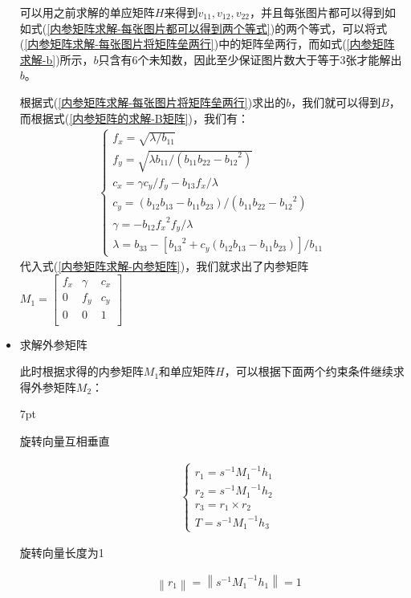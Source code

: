 \documentclass{article}
\newenvironment{formal}{%
	\def\FrameCommand{%
		\hspace{1pt}%
		{\color{DarkBlue}\vrule width 2pt}%
		{\color{formalshade}\vrule width 4pt}%
		\colorbox{formalshade}%
	}%
	\MakeFramed{\advance\hsize-\width\FrameRestore}%
	\noindent\hspace{-4.55pt}%
	\begin{adjustwidth}{}{7pt}%
		\vspace{2pt}\vspace{2pt}%
	}	{%
		\vspace{2pt}\end{adjustwidth}\endMakeFramed%
}
\begin{document}
\begin{itemize}
可以用之前求解的单应矩阵$H$来得到$v_{11},v_{12},v_{22}$，并且每张图片都可以得到如如式(\ref{内参矩阵求解-每张图片都可以得到两个等式})的两个等式，可以将式(\ref{内参矩阵求解-每张图片将矩阵垒两行})中的矩阵垒两行，而如式(\ref{内参矩阵求解-b})所示，$b$只含有6个未知数，因此至少保证图片数大于等于3张才能解出$b$。


根据式(\ref{内参矩阵求解-每张图片将矩阵垒两行})求出的$b$，我们就可以得到$B$，而根据式(\ref{内参矩阵的求解-B矩阵})，我们有：\\
\begin{align}
	\begin{cases}
		f_x=\sqrt{{{\lambda}\big/{b_{11}}}}\\ \nonumber
		f_y=\sqrt{{{\lambda b_{11}}\big/{\left( b_{11}b_{22}-{b_{12}}^2 \right)}}}\\ \nonumber
		c_x={{\gamma  c_y}\big/{f_y}}-{{b_{13}f_x}\big/{\lambda}}\\ \nonumber
		c_y={{\left( b_{12}b_{13}-b_{11}b_{23} \nonumber \right)}\big/{\left( b_{11}b_{22}-{b_{12}}^2 \right)}}\\
		\gamma =-{{b_{12}{f_x}^2f_y}\big/{\lambda}}\\ \nonumber
		\lambda =b_{33}-{{\left[ {b_{13}}^2+c_y\left( b_{12}b_{13}-b_{11}b_{23} \right) \right]}\big/{b_{11}}} \nonumber
	\end{cases}
\end{align}
	代入式(\ref{内参矩阵求解-内参矩阵})，我们就求出了内参矩阵$M_1=\left[ \begin{matrix}
		f_x&		\gamma&		c_x\\
		0&		f_y&		c_y\\
		0&		0&		1\\
	\end{matrix} \right] $

	\item 求解外参矩阵
	
此时根据求得的内参矩阵$M_1$和单应矩阵$H$，可以根据下面两个约束条件继续求得外参矩阵$M_2$：

\begin{formal}
\begin{description}
	\item[旋转向量互相垂直] 
	\begin{align}
		\begin{cases}
			r_1=s^{-1}{M_1}^{-1}h_1\\ \nonumber
			r_2=s^{-1}{M_1}^{-1}h_2\\ \nonumber
			r_3=r_1\times r_2\\ \nonumber
			T=s^{-1}{M_1}^{-1}h_3 \nonumber
		\end{cases}
	\end{align}
	\item[旋转向量长度为1]
	\begin{align}
		\left\| r_1 \right\| =\left\| s^{-1}{M_1}^{-1}h_1 \right\| =1 \nonumber
	\end{align}
\end{description}
\end{formal}
\end{itemize}
\end{document}
